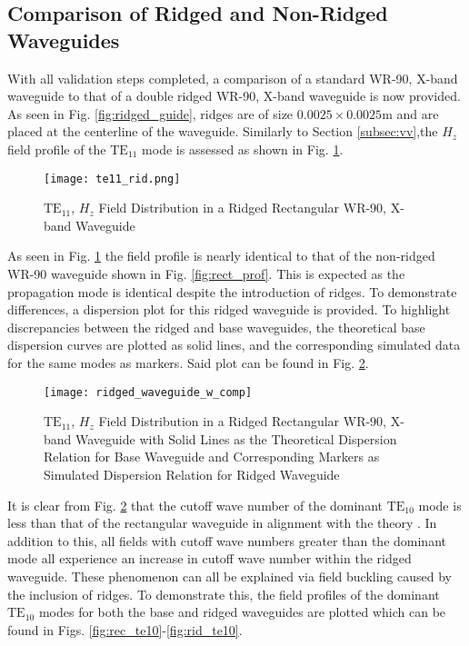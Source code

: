 \subsection{Comparison of Ridged and Non-Ridged Waveguides}
\label{subsec:rid_guides}
With all validation steps completed, a comparison of a standard WR-90, X-band waveguide to that of a double ridged WR-90, X-band waveguide is now provided. As seen in Fig. \ref{fig:ridged_guide}, ridges are of size $0.0025\times0.0025$m and are placed at the centerline of the waveguide. Similarly to Section \ref{subsec:vv},the $H_z$ field profile of the $\mathrm{TE_{11}}$ mode is assessed as shown in Fig. \ref{fig:rid_prof}.

\begin{figure}[h!]  
	\centering
	\texttt{[image: te11\_rid.png]} 
	\caption{$\mathrm{TE_{11}}$, $H_z$ Field Distribution in a Ridged Rectangular WR-90, X-band Waveguide}
	\label{fig:rid_prof}
\end{figure}

As seen in Fig. \ref{fig:rid_prof} the field profile is nearly identical to that of the non-ridged WR-90 waveguide shown in Fig. \ref{fig:rect_prof}. This is expected as the propagation mode is identical despite the introduction of ridges. To demonstrate differences, a dispersion plot for this ridged waveguide is provided. To highlight discrepancies between the ridged and base waveguides, the theoretical base dispersion curves are plotted as solid lines, and the corresponding simulated data for the same modes as markers. Said plot can be found in Fig. \ref{fig:rid_disp}.

\begin{figure}[h!]  
	\centering
	\texttt{[image: ridged\_waveguide\_w\_comp]} 
	\caption{$\mathrm{TE_{11}}$, $H_z$ Field Distribution in a Ridged Rectangular WR-90, X-band Waveguide with Solid Lines as the Theoretical Dispersion Relation for Base Waveguide and Corresponding Markers as Simulated Dispersion Relation for Ridged Waveguide}
	\label{fig:rid_disp}
\end{figure}

It is clear from Fig. \ref{fig:rid_disp} that the cutoff wave number of the dominant $\mathrm{TE}_{10}$ mode is less than that of the rectangular waveguide in alignment with the theory \cite{pozar2011microwave}. In addition to this, all fields with cutoff wave numbers greater than the dominant mode all experience an increase in cutoff wave number within the ridged waveguide. These phenomenon can all be explained via field buckling caused by the inclusion of ridges. To demonstrate this, the field profiles of the dominant $\mathrm{TE}_{10}$ modes for both the base and ridged waveguides are plotted which can be found in Figs. \ref{fig:rec_te10}-\ref{fig:rid_te10}.

